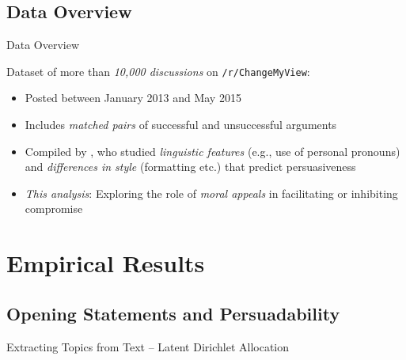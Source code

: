 \documentclass{beamer}
\begin{document}
\subsection{Data Overview}
\begin{frame}{Data Overview}

Dataset of more than \emph{10,000 discussions} on \texttt{/r/ChangeMyView}: 
\begin{itemize}[<+->]
	\item Posted between January 2013 and May 2015
	\item Includes \emph{matched pairs} of successful and unsuccessful arguments
	\item Compiled by \citet{tan2016winning}, who studied \emph{linguistic features} (e.g., use of personal pronouns) and \emph{differences in style} (formatting etc.) that predict persuasiveness
	\vspace{1em}
	\item \emph{This analysis}: Exploring the role of \emph{moral appeals} in facilitating or inhibiting compromise
\end{itemize}
\end{frame}


\section{Empirical Results}

\subsection{Opening Statements and Persuadability}
\begin{frame}{Extracting Topics from Text -- Latent Dirichlet Allocation}
\begin{figure}
\end{figure}
\end{frame}
\end{document}
